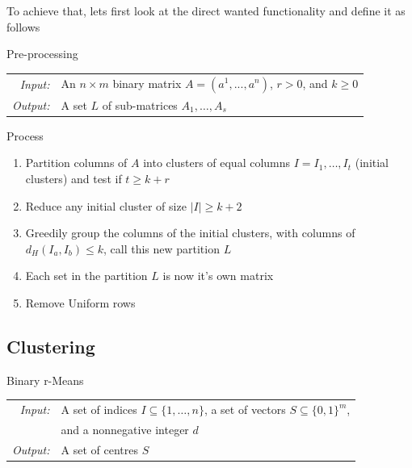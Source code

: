 \documentclass{beamer}
\begin{document}
\begin{frame}
  To achieve that, lets first look at the direct wanted functionality and define it as follows

  \begin{block}{Pre-processing}
    \begin{tabular}{r l}
      \textit{Input:}  & An $n \times m$ binary matrix $A=(a^1,...,a^n)$, $r > 0$, and $k \geq 0$ \\
      \textit{Output:} & A set $L$ of sub-matrices $A_1,\dots,A_s$
    \end{tabular}
  \end{block}

  \pause

  \begin{block}{Process}
    \begin{enumerate}
      \item<3-> Partition columns of $A$ into clusters of equal columns $I = {I_1, \dots, I_t}$ (\alert{initial clusters})
      and test if $t \ge k+r$
      \item<4-> Reduce any initial cluster of size $|I| \geq k+2$
      \item<5-> Greedily group the columns of the initial clusters, with columns of $d_H(I_a,I_b) \leq k$, call this new
      partition $L$
      \item<6-> Each set in the partition $L$ is now it's own matrix
      \item<7-> Remove \alert{Uniform rows}
    \end{enumerate}
  \end{block}
\end{frame}

\subsection{Clustering}
\begin{frame}
  \begin{block}{Binary r-Means}
    \begin{tabular}{r l}
      \textit{Input:}  & A set of indices $I \subseteq \{1,\dots,n\}$, a set of vectors
      $S \subseteq \{0,1\}^m$,                                                          \\
                       & and a nonnegative integer $d$                                  \\
      \textit{Output:} & A set of centres $S$
    \end{tabular}
  \end{block}


\end{frame}
\end{document}
